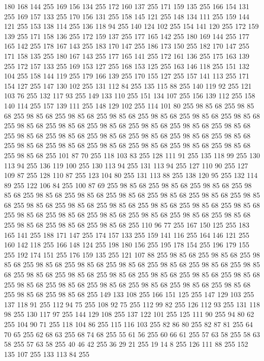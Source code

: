 180 168 144 255 169 156 134 255 172 160 137 255 171 159 135 255 166 154 131 255 169 157 133 255 170 156 131 255 158 145 121 255 148 134 111 255 159 144 121 255 153 138 114 255 136 118 94 255 140 124 102 255 154 141 120 255 172 159 139 255 171 158 136 255 172 159 137 255 177 165 142 255 180 169 144 255 177 165 142 255 178 167 143 255 183 170 147 255 186 173 150 255 182 170 147 255 171 158 135 255 180 167 143 255 177 165 141 255 172 161 136 255 175 163 139 255 172 157 133 255 169 153 127 255 168 153 125 255 163 146 118 255 151 132 104 255 158 144 119 255 179 166 139 255 170 155 127 255 157 141 113 255 171 154 127 255 147 130 102 255 131 112 84 255 135 115 88 255 140 119 92 255 121 103 76 255 132 117 93 255 149 133 110 255 151 134 107 255 156 139 112 255 158 140 114 255 157 139 111 255 148 129 102 255 114 101 80 255 98 85 68 255 98 85 68 255 98 85 68 255 98 85 68 255 98 85 68 255 98 85 68 255 98 85 68 255 98 85 68 255 98 85 68 255 98 85 68 255 98 85 68 255 98 85 68 255
98 85 68 255 98 85 68 255 98 85 68 255 98 85 68 255 98 85 68 255 98 85 68 255 98 85 68 255 98 85 68 255 98 85 68 255 98 85 68 255 98 85 68 255 98 85 68 255 98 85 68 255 98 85 68 255 98 85 68 255 101 87 70 255 118 103 83 255 128 111 91 255 135 118 99 255 130 113 94 255 136 119 100 255 130 113 94 255 131 113 94 255 127 110 90 255 127 109 87 255 128 110 87 255 123 104 80 255 131 113 88 255 138 120 95 255 132 114 89 255 122 106 84 255 100 87 69 255 98 85 68 255 98 85 68 255 98 85 68 255 98 85 68 255 98 85 68 255 98 85 68 255 98 85 68 255 98 85 68 255 98 85 68 255 98 85 68 255 98 85 68 255 98 85 68 255 98 85 68 255 98 85 68 255 98 85 68 255 98 85 68 255 98 85 68 255 98 85 68 255 98 85 68 255 98 85 68 255 98 85 68 255 98 85 68 255 98 85 68 255 98 85 68 255 98 85 68 255 110 96 77 255 167 150 125 255 183 165 141 255 188 171 147 255 174 157 133 255 159 141 116 255 164 146 121 255
160 142 118 255 166 148 124 255 198 180 156 255 195 178 154 255 196 179 155 255 192 174 151 255 176 159 135 255 121 107 88 255 98 85 68 255 98 85 68 255 98 85 68 255 98 85 68 255 98 85 68 255 98 85 68 255 98 85 68 255 98 85 68 255 98 85 68 255 98 85 68 255 98 85 68 255 98 85 68 255 98 85 68 255 98 85 68 255 98 85 68 255 98 85 68 255 98 85 68 255 98 85 68 255 98 85 68 255 98 85 68 255 98 85 68 255 98 85 68 255 98 85 68 255 149 133 108 255 166 151 125 255 147 129 103 255 137 118 91 255 112 94 75 255 108 92 75 255 112 99 82 255 126 112 93 255 131 118 98 255 130 117 97 255 144 129 108 255 137 122 101 255 125 111 90 255 94 80 62 255 104 90 71 255 118 104 86 255 115 116 103 255 82 86 80 255 82 87 81 255 64 70 65 255 62 68 63 255 68 74 68 255 55 61 56 255 60 66 61 255 57 63 58 255 58 63 58 255 57 63 58 255 40 46 42 255 36 29 21 255 19 14 8 255 126 111 88 255 152 135 107 255 133 113 84 255
